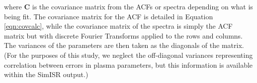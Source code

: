 \documentclass[draft,ras]{agutex}
\begin{document}
\begin{article}
\noindent where $ \mathbf{C}$ is the covariance matrix from the ACFs or spectra depending on what is being fit. The covariance matrix for the ACF is detailed in Equation \ref{eqn:covcalc}, while the covariance matrix of the spectra is simply the ACF matrix but with discrete Fourier Transforms applied to the rows and columns. The variances of the parameters are then taken as the diagonals of the matrix.  (For the purposes of this study, we neglect the off-diagonal variances representing correlation between errors in plasma parameters, but this information is available within the SimISR output.)


%
%







\end{article}
\end{document}

